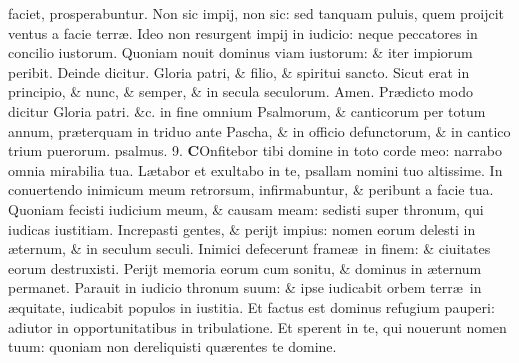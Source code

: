 \documentclass[a5paper,10pt]{book}
\def\ae{æ}
\begin{document}
\begin{multicols*}{2}
faciet, prosperabuntur.
\newline \color{red} N\color{black}on sic impij, non sic: sed tanquam puluis, quem proijcit ventus a facie terr\ae .
\newline \color{red} I\color{black}deo non resurgent impij in iudicio: neque peccatores in concilio iustorum.
\newline \color{red} Q\color{black}uoniam nouit dominus viam iustorum: \& iter impiorum peribit.
\color{red} \quad Deinde dicitur. \color{black}
\newline \color{red} G\color{black}loria patri, \& filio, \& spiritui sancto.
\newline \color{red} S\color{black}icut erat in principio, \& nunc, \& semper, \& in secula seculorum. Amen. %
\newline
\color{red} Pr\ae dicto modo dicitur \color{black} Gloria patri. \color{red} \&c. in fine omnium Psalmorum, \& canticorum per totum annum, pr\ae terquam in triduo ante Pascha, \& in officio defunctorum, \& in cantico trium puerorum. \quad psalmus. 9. \color{black}
\lettrine[lines=2]{\bfseries \color{red} C}{}Onfitebor tibi domine in toto corde meo: narrabo omnia mirabilia tua.
\newline \color{red} L\color{black}\ae tabor et exultabo in te, psallam nomini tuo altissime.
\newline \color{red} I\color{black}n conuertendo inimicum meum retrorsum, infirmabuntur, \& peribunt a facie tua.
\newline \color{red} Q\color{black}uoniam fecisti iudicium meum, \& causam meam: sedisti super thronum, qui iudicas iustitiam.
\newline \color{red} I\color{black}ncrepasti gentes, \& perijt impius: nomen eorum delesti in \ae ternum, \& in seculum seculi.
\newline \color{red} I\color{black}nimici defecerunt frame\ae \ in finem: \& ciuitates eorum destruxisti.
\newline \color{red} P\color{black}erijt memoria eorum cum sonitu, \& dominus in \ae ternum permanet.
\newline \color{red} P\color{black}arauit in iudicio thronum suum: \& ipse iudicabit orbem terr\ae \ in \ae quitate, iudicabit populos in iustitia.
\newline \color{red} E\color{black}t factus est dominus refugium pauperi: adiutor in opportunitatibus in tribulatione.
\newline \color{red} E\color{black}t sperent in te, qui nouerunt nomen tuum: quoniam non dereliquisti qu\ae rentes te domine.

\end{multicols*}
\end{document}
